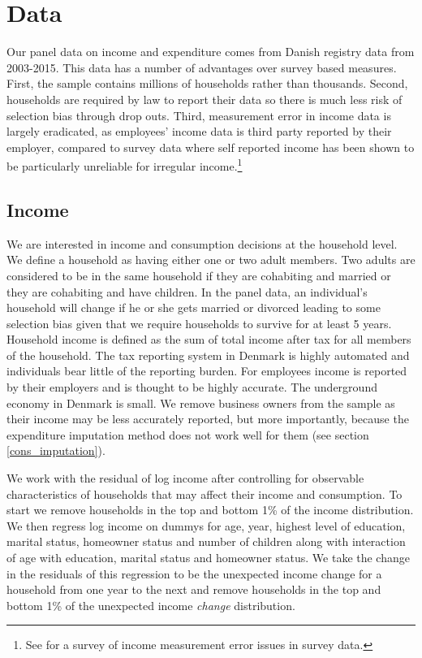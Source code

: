 \documentclass[titlepage]{\econtex}\newcommand{\texname}{IncomeUncertainty}
\begin{document}
\section{Data}
Our panel data on income and expenditure comes from Danish registry data from 2003-2015. This data has a number of advantages over survey based measures. First, the sample contains millions of households rather than thousands. Second, households are required by law to report their data so there is much less risk of selection bias through drop outs. Third, measurement error in income data is largely eradicated, as employees' income data is third party reported by their employer, compared to survey data where self reported income has been shown to be particularly unreliable for irregular income.\footnote{See \cite{david_income_nodate} for a survey of income measurement error issues in survey data.}

\subsection{Income} \label{income}
We are interested in income and consumption decisions at the household level. We define a household as having either one or two adult members. Two adults are considered to be in the same household if they are cohabiting and married or they are cohabiting and have children. In the panel data, an individual's household will change if he or she gets married or divorced leading to some selection bias given that we require households to survive for at least 5 years. Household income is defined as the sum of total income after tax for all members of the household. The tax reporting system in Denmark is highly automated and individuals bear little of the reporting burden. For employees income is reported by their employers and is thought to be highly accurate. The underground economy in Denmark is small. We remove business owners from the sample as their income may be less accurately reported, but more importantly, because the expenditure imputation method does not work well for them (see section \ref{cons_imputation}).

We work with the residual of log income after controlling for observable characteristics of households that may affect their income and consumption. To start we remove households in the top and bottom 1\% of the income distribution. We then regress log income on dummys for age, year, highest level of education, marital status, homeowner status and number of children along with interaction of age with education, marital status and homeowner status. We take the change in the residuals of this regression to be the unexpected income change for a household from one year to the next and remove households in the top and bottom 1\% of the unexpected income \textit{change} distribution.
\end{document}
